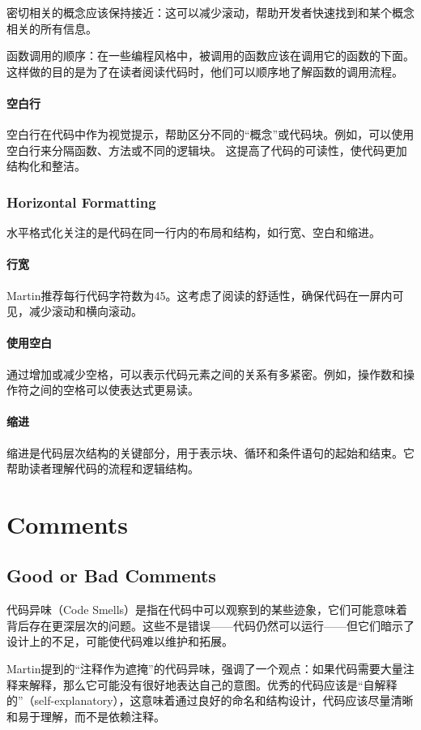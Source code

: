 \documentclass[]{ctexbook}
\begin{document}
密切相关的概念应该保持接近：这可以减少滚动，帮助开发者快速找到和某个概念相关的所有信息。

函数调用的顺序：在一些编程风格中，被调用的函数应该在调用它的函数的下面。这样做的目的是为了在读者阅读代码时，他们可以顺序地了解函数的调用流程。
\subsubsection{空白行}
空白行在代码中作为视觉提示，帮助区分不同的“概念”或代码块。例如，可以使用空白行来分隔函数、方法或不同的逻辑块。
这提高了代码的可读性，使代码更加结构化和整洁。

\subsection{Horizontal Formatting}

水平格式化关注的是代码在同一行内的布局和结构，如行宽、空白和缩进。

\subsubsection{行宽}
Martin推荐每行代码字符数为45。这考虑了阅读的舒适性，确保代码在一屏内可见，减少滚动和横向滚动。
\subsubsection{使用空白}
通过增加或减少空格，可以表示代码元素之间的关系有多紧密。例如，操作数和操作符之间的空格可以使表达式更易读。
\subsubsection{缩进}
缩进是代码层次结构的关键部分，用于表示块、循环和条件语句的起始和结束。它帮助读者理解代码的流程和逻辑结构。


\chapter{Comments}

\section{Good or Bad Comments}

代码异味（Code Smells）是指在代码中可以观察到的某些迹象，它们可能意味着背后存在更深层次的问题。这些不是错误——代码仍然可以运行——但它们暗示了设计上的不足，可能使代码难以维护和拓展。

Martin提到的“注释作为遮掩”的代码异味，强调了一个观点：如果代码需要大量注释来解释，那么它可能没有很好地表达自己的意图。优秀的代码应该是“自解释的”（self-explanatory），这意味着通过良好的命名和结构设计，代码应该尽量清晰和易于理解，而不是依赖注释。
\end{document}
